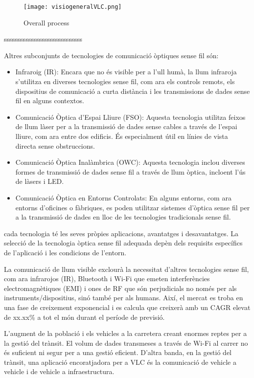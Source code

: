 \begin{figure}[h!]
    \centering
    \texttt{[image: visiogeneralVLC.png]}
    \caption{Overall process}
    \label{fig:method}
\end{figure}

sssssssssssssssssssssssssssss


Altres subconjunts de tecnologies de comunicació òptiques sense fil són:
\begin{itemize}
    \item Infraroig (IR): Encara que no és visible per a l'ull humà, la llum infraroja s'utilitza en diverses tecnologies sense fil, com ara els controls remots, els dispositius de comunicació a curta distància i les transmissions de dades sense fil en alguns contextos.
    \item Comunicació Òptica d'Espai Lliure (FSO): Aquesta tecnologia utilitza feixos de llum làser per a la transmissió de dades sense cables a través de l'espai lliure, com ara entre dos edificis. És especialment útil en línies de vista directa sense obstruccions.
    \item Comunicació Òptica Inalàmbrica (OWC): Aquesta tecnologia inclou diverses formes de transmissió de dades sense fil a través de llum òptica, incloent l'ús de làsers i LED.
    \item Comunicació Òptica en Entorns Controlats: En alguns entorns, com ara entorns d'oficines o fàbriques, es poden utilitzar sistemes d'òptica sense fil per a la transmissió de dades en lloc de les tecnologies tradicionals sense fil.
\end{itemize}

cada tecnologia té les seves pròpies aplicacions, avantatges i desavantatges. La selecció de la tecnologia òptica sense fil adequada depèn dels requisits específics de l'aplicació i les condicions de l'entorn.


La comunicació de llum visible exclourà la necessitat d'altres tecnologies sense fil, com ara infrarojos (IR), Bluetooth i Wi-Fi que emeten interferències electromagnètiques (EMI) i ones de RF que són perjudicials no només per als instruments/dispositius, sinó també per als humans. Així, el mercat es troba en una fase de creixement exponencial i es calcula que creixerà amb un CAGR elevat de xx.xx\% a tot el món durant el període de previsió.


L'augment de la població i els vehicles a la carretera creant enormes reptes per a la gestió del trànsit. El volum de dades transmeses a través de Wi-Fi al carrer no és suficient ni segur per a una gestió eficient. D'altra banda, en la gestió del trànsit, una aplicació encoratjadora per a VLC és la comunicació de vehicle a vehicle i de vehicle a infraestructura.

